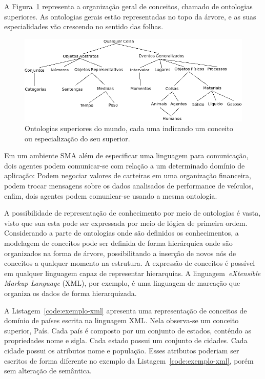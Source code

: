 A Figura~\ref{fig:arvore-ontologia} representa a organização geral de conceitos, chamado de ontologias superiores. As ontologias gerais estão representadas no topo da árvore, e as suas especialidades vão crescendo no sentido das folhas.
\begin{figure}
	\centering
	\includegraphics[scale=0.65]{images/arvore-ontologia.png}
	\caption{Ontologias superiores do mundo, cada uma indicando um conceito ou especialização do seu superior.}
	\label{fig:arvore-ontologia}
\end{figure}

Em um ambiente SMA além de especificar uma linguagem para comunicação, dois agentes podem comunicar-se com relação a um determinado domínio de aplicação: Podem negociar valores de carteiras em uma organização financeira, podem trocar mensagens sobre os dados analisados de performance de veículos, enfim, dois agentes podem comunicar-se usando a mesma ontologia.

A possibilidade de representação de conhecimento por meio de ontologias é vasta, visto que sua esta pode ser expressada por meio de lógica de primeira ordem. Considerando a parte de ontologias onde são definidos os conhecimentos, a modelagem de conceitos pode ser definida de forma hierárquica onde são organizados na forma de árvore, possibilitando a inserção de novos nós de conceitos a qualquer momento na estrutura.
A expressão de conceitos é possível em qualquer linguagem capaz de representar hierarquias. A linguagem~\emph{eXtensible Markup Language} (XML), por exemplo, é uma linguagem de marcação que organiza os dados de forma hierarquizada.

A Listagem~\ref{code:exemplo-xml} apresenta uma representação de conceitos de domínio de países escrita na linguagem XML. Nela observa-se um conceito superior, País. Cada país é composto por um conjunto de estados, conténdo as propriedades nome e sigla. Cada estado possui um conjunto de cidades. Cada cidade possui os atributos nome e população. Esses atributos poderiam ser escritos de forma diferente no exemplo da Listagem~\ref{code:exemplo-xml}, porém sem alteração de semântica.


